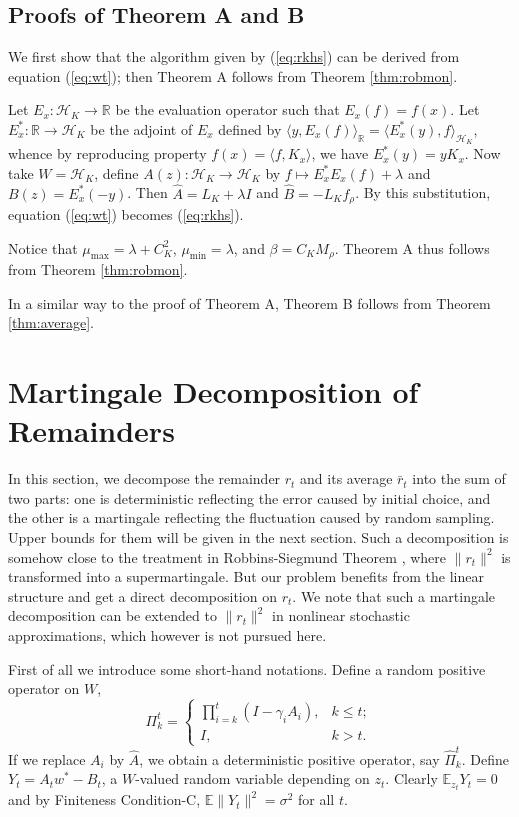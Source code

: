 \documentclass[twoside,twocolumn,journal]{IEEEtran}
\newenvironment{pf}[1][Proof]{\medskip\noindent\hspace{1em}{\itshape #1: }}{\hspace*{\fill}~\QED\par\endtrivlist\medskip}
\newcommand{\DS}{\displaystyle}
\def\R{{\mathbb R}}        %
\def\E{{\mathbb E}}        %
\def\<{{\langle}}
\def\>{{\rangle}}
\def\H{{\mathscr H}}
\def\amax{{\mu_{\max}}}
\def\amin{{\mu_{\min}} }
\begin{document}
\subsection{Proofs of Theorem A and B}

\begin{pf}[Proof of Theorem A]
We first show that the algorithm given by (\ref{eq:rkhs}) can be derived from equation (\ref{eq:wt}); then Theorem A follows from Theorem \ref{thm:robmon}.

Let $E_x:\H_K \to \R$ be the evaluation operator
such that $E_x(f)=f(x)$. Let $E_x^\ast:\R\to \H_K$ be the adjoint of $E_x$ defined by $\<y,E_x(f)\>_{\R} =\<E_x^\ast(y),f\>_{\H_K}$,
whence by reproducing property $f(x)=\<f,K_x\>$, we have $E_x^\ast(y)=y K_x$. Now take $W=\H_K$, define $A(z):\H_K \to \H_K$ by
$f\mapsto  E_x^\ast E_x(f) + \lambda $
and $B(z) = E_x^\ast(-y)$. Then $\hat{A}=L_K + \lambda I$ and $\hat{B}=-L_K f_\rho$.
By this substitution, equation (\ref{eq:wt}) becomes (\ref{eq:rkhs}).

Notice that $\amax= \lambda + C_K^2$, $\amin=\lambda$, and $\beta= C_K M_{\rho}$. Theorem A thus follows from
Theorem \ref{thm:robmon}.
\end{pf}

\begin{pf}[Proof of Theorem B]
In a similar way to the proof of Theorem A, Theorem B follows from Theorem \ref{thm:average}.
\end{pf}

\section{Martingale Decomposition of Remainders}

In this section, we decompose the remainder $r_t$ and its average $\bar{r}_t$ into the sum of two parts: one
is deterministic reflecting the error caused by initial choice, and the other is a martingale reflecting the
fluctuation caused by random sampling. Upper bounds for them will be given in the next section. Such a decomposition is somehow
close to the treatment in Robbins-Siegmund Theorem \cite{RobSie71}, where $\|r_t\|^2$ is transformed into a supermartingale.
But our problem benefits from the linear structure and get a direct decomposition on $r_t$.
We note that such a martingale decomposition can be extended to $\|r_t\|^2$ in nonlinear stochastic approximations, which however
is not pursued here.

First of all we introduce some short-hand notations. Define a
random positive operator on $W$,
\begin{equation} {\Pi}_k^t=
\left\{
\begin{array}{lr}
\DS \prod_{i=k}^t \left( I - \gamma_i A_i \right), & k\leq t; \\
I, & k>t.
\end{array}
\right.
\end{equation}
If we replace $A_i$ by $\hat{A}$, we obtain a deterministic positive operator, say $\hat{\Pi}_k^t$.
Define $Y_t = A_t w^\ast - B_t$, a $W$-valued random variable
depending on $z_t$. Clearly $\E_{z_t} Y_t = 0$ and by Finiteness
Condition-C, $\E\|Y_t\|^2 = \sigma^2$ for all $t$.
\end{document}
